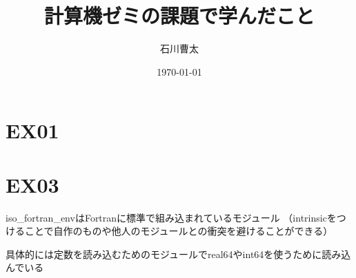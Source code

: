 \documentclass[dvipdfmx]{jsarticle}
\title{計算機ゼミの課題で学んだこと}
\author{石川曹太}
\date{\today}
\begin{document}
\maketitle

\section{EX01}

\section{EX03}
iso\_fortran\_envはFortranに標準で組み込まれているモジュール
（intrinsicをつけることで自作のものや他人のモジュールとの衝突を避けることができる）

具体的には定数を読み込むためのモジュールでreal64やint64を使うために読み込んでいる
\end{document}
